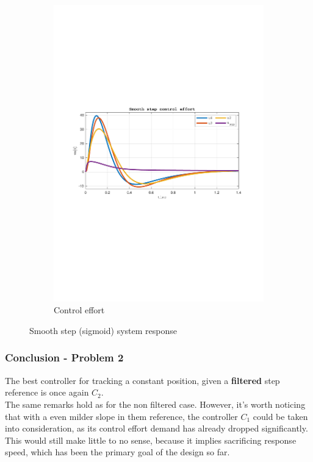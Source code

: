 \documentclass[a4paper, 12pt]{article}
\begin{document}
\begin{figure}[h!]
\begin{subfigure}[b]{0.45\textwidth}
        \includegraphics[width=\textwidth]
         {Figures/fig06b.pdf}
        \caption{Control effort}
        \label{fig:fig06b}
    \end{subfigure}
    \caption{Smooth step (sigmoid) system response}
    \label{fig:fig06}
\end{figure}
\clearpage
\subsubsection{Conclusion - Problem 2}
The best controller for tracking a constant position, given a \textbf{filtered} step reference is once again $C_2$. \\
The same remarks hold as for the non filtered case. However, it's worth noticing that with a even milder slope in them reference, the controller $C_1$ could be taken into consideration, as its control effort demand has already dropped significantly. This would still make little to no sense, because it implies sacrificing response speed, which has been the primary goal of the design so far.
\end{document}

